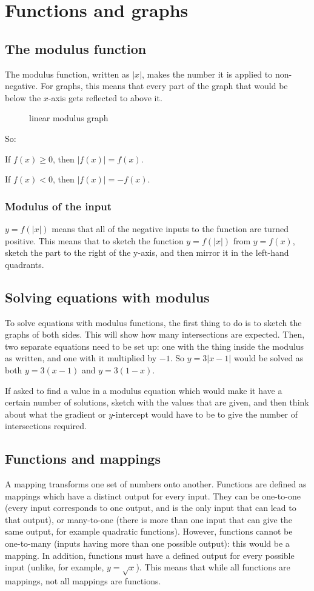 \section{Functions and graphs}
\subsection{The modulus function}
The modulus function, written as $|x|$, makes the number it is applied to non-negative.
For graphs, this means that every part of the graph that would be below the $x$-axis gets reflected to above it.
\begin{figure}[ht]
    \centering
    \caption{linear modulus graph}
    \label{fig:linear-modulus-graph}
\end{figure}

So: 

If $f(x) \ge 0$, then $|f(x)|=f(x)$.

If $f(x)<0$, then $|f(x)|=-f(x)$.

\subsubsection{Modulus of the input}
$y=f(|x|)$ means that all of the negative inputs to the function are turned positive. This means that to sketch the function $y=f(|x|)$ from $y=f(x)$, sketch the part to the right of the y-axis, and then mirror it in the left-hand quadrants.

\subsection{Solving equations with modulus}
To solve equations with modulus functions, the first thing to do is to sketch the graphs of both sides. This will show how many intersections are expected. Then, two separate equations need to be set up: one with the thing inside the modulus as written, and one with it multiplied by $-1$. So $y=3|x-1|$ would be solved as both $y=3(x-1)$ and $y=3(1-x)$.

If asked to find a value in a modulus equation which would make it have a certain number of solutions, sketch with the values that are given, and then think about what the gradient or $y$-intercept would have to be to give the number of intersections required.

\subsection{Functions and mappings}
A mapping transforms one set of numbers onto another. Functions are defined as mappings which have a distinct output for every input. They can be one-to-one (every input corresponds to one output, and is the only input that can lead to that output), or many-to-one (there is more than one input that can give the same output, for example quadratic functions). However, functions cannot be one-to-many (inputs having more than one possible output): this would be a mapping. In addition, functions must have a defined output for every possible input (unlike, for example, $y=\sqrt x$). This means that while all functions are mappings, not all mappings are functions.

